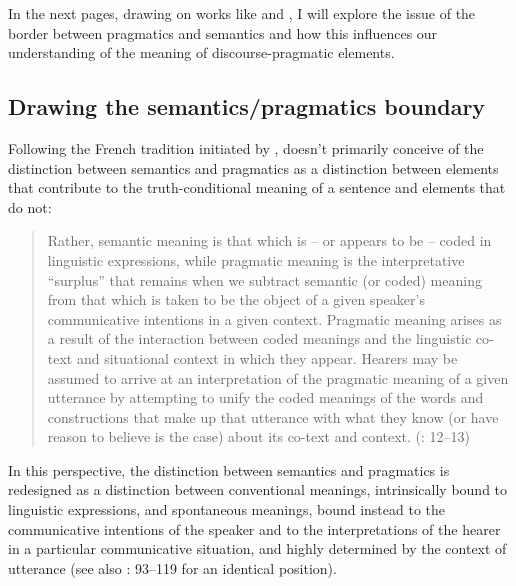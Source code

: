 In the next pages, drawing on works like \citet{Hansen1998a,Hansen2008,Hansen2012} and \citet{Ariel2008,Ariel2010}, I will explore the issue of the border between pragmatics and semantics and how this influences our understanding of the meaning of discourse-pragmatic elements.

\subsection{Drawing the semantics/pragmatics boundary}
\hypertarget{Toc124860628}{}
Following the French tradition initiated by \citet{DucrotEtAl1980}, \citet{Hansen2008} doesn’t primarily conceive of the distinction between semantics and pragmatics as a distinction between elements that contribute to the truth-conditional meaning of a sentence and elements that do not:

\begin{quote}
Rather, semantic meaning is that which is – or appears to be – coded in linguistic expressions, while pragmatic meaning is the interpretative “surplus” that remains when we subtract semantic (or coded) meaning from that which is taken to be the object of a given speaker’s communicative intentions in a given context. Pragmatic meaning arises as a result of the interaction between coded meanings and the linguistic co-text and situational context in which they appear. Hearers may be assumed to arrive at an interpretation of the pragmatic meaning of a given utterance by attempting to unify the coded meanings of the words and constructions that make up that utterance with what they know (or have reason to believe is the case) about its co-text and context. (\citealt{Hansen2008}: 12–13)
\end{quote}

In this perspective, the distinction between semantics and pragmatics is redesigned as a distinction between conventional meanings, intrinsically bound to linguistic expressions, and spontaneous meanings, bound instead to the communicative intentions of the speaker and to the interpretations of the hearer in a particular communicative situation, and highly determined by the context of utterance (see also \citealt{Ariel2010}: 93–119 for an identical position).

